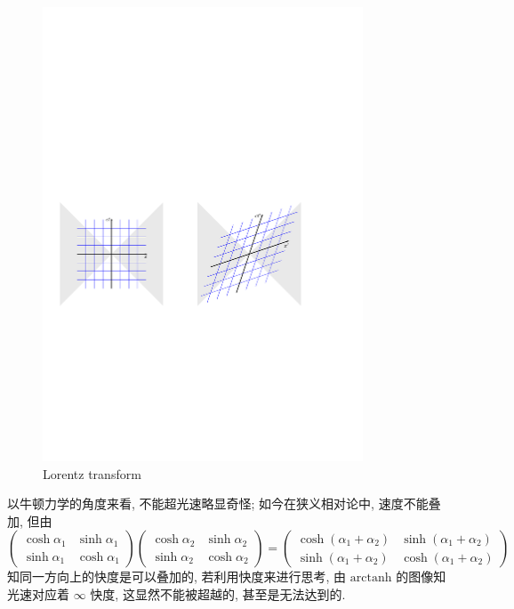 \begin{figure}[H]
    \centering
    \includegraphics[width=0.85\textwidth]{pic/Lorentz transform.pdf}
    \caption{Lorentz transform}
    \label{Lorentz transform}
\end{figure}

以牛顿力学的角度来看, 不能超光速略显奇怪; 如今在狭义相对论中, 速度不能叠加, 但由    
\[ \left(\begin{matrix}
    \cosh\alpha_1 & \sinh\alpha_1\\ 
    \sinh\alpha_1 & \cosh\alpha_1
\end{matrix}\right)\left(\begin{matrix}
    \cosh\alpha_2 & \sinh\alpha_2\\ 
    \sinh\alpha_2 & \cosh\alpha_2
\end{matrix}\right)=\left(\begin{matrix}
    \cosh(\alpha_1+\alpha_2) & \sinh(\alpha_1+\alpha_2)\\ 
    \sinh(\alpha_1+\alpha_2) & \cosh(\alpha_1+\alpha_2)
\end{matrix}\right) \] 
知同一方向上的快度是可以叠加的, 若利用快度来进行思考, 由 $\mathrm{arctanh}$ 的图像知光速对应着 $\infty$ 快度, 这显然不能被超越的, 甚至是无法达到的.